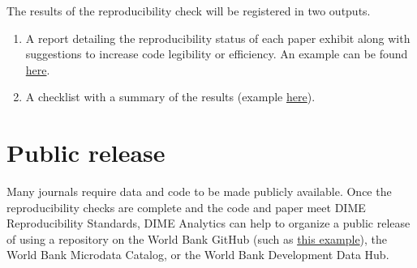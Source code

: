 \begin{fullwidth}
	\bigskip
	
	The results of the reproducibility check will be registered in two outputs.

	\bigskip

	\begin{enumerate}
		\setlength\itemsep{-0.1em}
		\item A report detailing the reproducibility status of each paper exhibit along with suggestions to increase code legibility or efficiency. An example can be found \href{https://github.com/worldbank/dime-standards/blob/master/dime-research-standards/pillar-3-research-reproducibility/DIME%20Analytics%20Reproducibility%20Check%20Comments%20example.pdf}{here}.
		\item A checklist with a summary of the results (example \href{https://raw.githubusercontent.com/worldbank/dime-standards/master/dime-research-standards/pillar-3-research-reproducibility/checklists/Reproducibility%20check%20result%20template.pdf}{here}).
	\end{enumerate}

	\bigskip

	\section*{Public release}

	Many journals require data and code to be made publicly available. Once the reproducibility checks are complete and the code and paper meet DIME Reproducibility Standards, DIME Analytics can help to organize a public release of using a repository on the World Bank GitHub (such as \href{https://github.com/worldbank/rio-safe-space}{this example}), the World Bank Microdata Catalog, or the World Bank Development Data Hub.

	\end{fullwidth}

